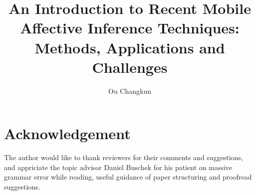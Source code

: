 \documentclass[journal]{vgtc}
\title{An Introduction to Recent Mobile Affective Inference Techniques: \\Methods, Applications and Challenges}
\author{Ou Changkun}
\begin{document}
\maketitle








\section*{Acknowledgement}

The author would like to thank reviewers for their comments and suggestions, and appriciate the topic advisor Daniel Buschek for his patient on massive grammar error while reading, useful guidance of paper structuring and proofread suggestions.

\nocite{*}
\printbibliography
\end{document}
